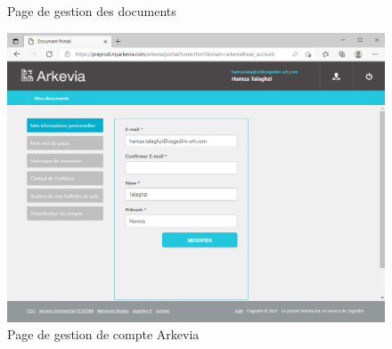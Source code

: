 \begin{appendices}
\begin{figure}[H]
\begin{center}
        \caption{Page de gestion des documents}
        \label{fig:batch}
    \end{center}
\end{figure}
\vfill\null
\begin{figure}[H]
    \begin{center}
        \includegraphics[width=\linewidth]{images/annexes/scr3.png}
        \caption{Page de gestion de compte Arkevia}
        \label{fig:batch}
    \end{center}
\end{figure}

\end{appendices}
